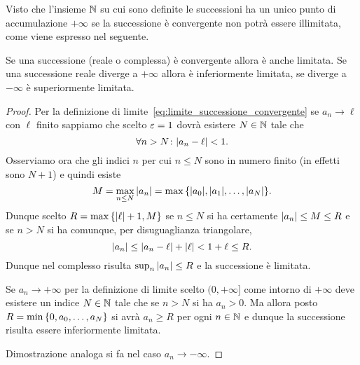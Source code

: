 Visto che l'insieme ${\mathbb N}$ su cui sono definite le successioni 
ha un unico punto di accumulazione $+\infty$ se la successione 
è convergente non potrà essere illimitata, come viene espresso nel seguente.

\begin{theorem}
\mymark{**}%
Se una successione (reale o complessa) è convergente allora è anche limitata.
Se una successione reale diverge a $+\infty$ allora è inferiormente limitata,
se diverge a $-\infty$ è superiormente limitata.
\end{theorem}
%
\begin{proof}
  Per la definizione di limite~\eqref{eq:limite_successione_convergente} 
  se $a_n\to \ell$ con $\ell$ finito sappiamo 
  che scelto $\varepsilon=1$ dovrà esistere $N\in {\mathbb N}$ tale che 
  \[
      \forall n>N\colon {\left|a_n - \ell\right|} < 1.
  \]
  Osserviamo ora che gli indici $n$ per cui $n\le N$ sono in numero finito 
  (in effetti sono $N+1$) e quindi esiste
  \[
   M = \max_{n\le N} {\left|a_n\right|} 
   = \max {\left\{ {\left|a_0\right|}, {\left|a_1\right|}, \dots , {\left|a_N\right|} \right\}}.  
  \]
  Dunque scelto $R=\max{\left\{ {\left|\ell\right|}+1,M \right\}}$ 
  se $n\le N$ si ha certamente ${\left|a_n\right|}\le M \le R$
  e se $n>N$ si ha comunque, per disuguaglianza triangolare,
  \[
  {\left|a_n\right|} \le {\left|a_n-\ell\right|} + {\left|\ell\right|} < 1+ \ell \le R.  
  \]
  Dunque nel complesso risulta $\sup_n {\left|a_n\right|}\le R$ e la successione 
  è limitata.

  Se $a_n\to +\infty$ per la definizione di limite 
  scelto $(0,+\infty]$ come intorno di $+\infty$ 
  deve esistere un indice $N\in {\mathbb N}$ tale che se $n>N$ si ha $a_n>0$. 
  Ma allora posto $R=\min{\left\{ 0, a_0,\dots,a_N \right\}}$
  si avrà $a_n\ge R$ per ogni $n\in {\mathbb N}$ e dunque la successione 
  risulta essere inferiormente limitata.

  Dimostrazione analoga si fa nel caso $a_n\to -\infty$.
\end{proof}


%

